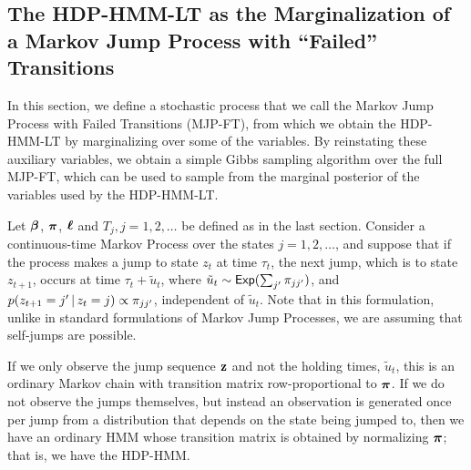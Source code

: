 \subsection{The HDP-HMM-LT as the Marginalization of
a Markov Jump Process with ``Failed'' Transitions}
\label{sec:mjp-ft}

In this section, we define a stochastic process that we call the
Markov Jump Process with Failed Transitions (MJP-FT), from which we obtain the HDP-HMM-LT
by marginalizing over some of the variables.  By reinstating these
auxiliary variables, we obtain a simple Gibbs sampling algorithm over
the full MJP-FT, which can be used to sample from the marginal
posterior of the variables used by the HDP-HMM-LT.

Let $\boldsymbol{\beta}$, $\boldsymbol{\pi}$, $\boldsymbol{\ell}$ and $T_j, j = 1, 2, \dots$ be defined as
in the last section. Consider a continuous-time Markov Process over the states $j = 1, 2,
\dots$, and suppose that if the process makes a jump to state 
$z_{t}$ at time $\tau_t$, the next jump, which is to state $z_{t+1}$, occurs at
time $\tau_t + \tilde{u}_t$, where $\tilde{u}_{t} \sim \mathsf{Exp}(\sum_{j'} \pi_{jj'})$,
and $p(z_{t+1} = j' \, \vert \, z_{t} = j) \propto
\pi_{jj'}$, independent of $\tilde{u}_t$.  Note that in this
formulation, unlike in standard formulations of Markov Jump Processes,
we are assuming that self-jumps are possible.

If we only observe the jump sequence $\mathbf{z}$ and not the holding times, 
$\tilde{u}_t$, this is an ordinary Markov chain with transition matrix row-proportional to
$\boldsymbol{\pi}$.  If we do not observe the jumps themselves, but
instead an observation is generated once per jump from a distribution that depends
on the state being jumped to, then we have an ordinary HMM whose
transition matrix is obtained by normalizing $\boldsymbol{\pi}$; that
is, we have the HDP-HMM.

